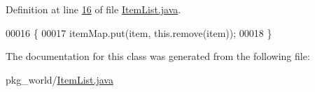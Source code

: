 Definition at line \hyperlink{ItemList_8java_source_l00016}{16} of file \hyperlink{ItemList_8java_source}{Item\-List.\-java}.


\begin{DoxyCode}
00016                                                                      \{
00017         itemMap.put(item, this.remove(item));
00018     \}
\end{DoxyCode}


The documentation for this class was generated from the following file\-:\begin{DoxyCompactItemize}
\item 
pkg\-\_\-world/\hyperlink{ItemList_8java}{Item\-List.\-java}\end{DoxyCompactItemize}
